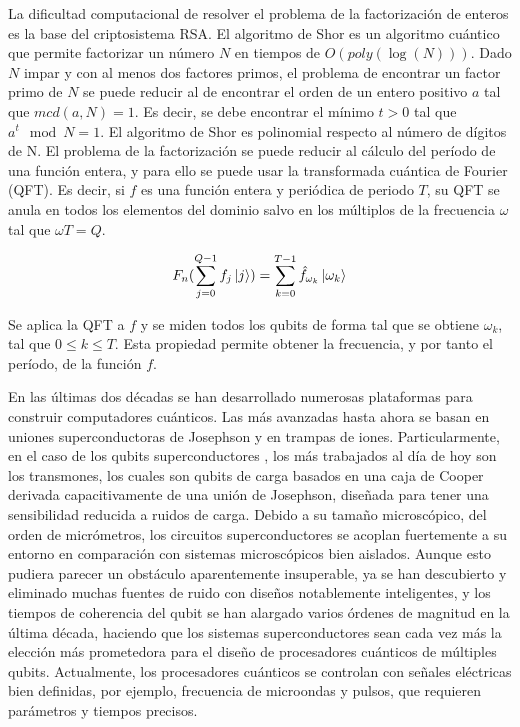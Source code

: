 La dificultad computacional de resolver el problema de la factorización de enteros es la base del criptosistema RSA. El algoritmo de Shor es un algoritmo cuántico que permite factorizar un número $N$ en tiempos de $O(poly(\log (N)))$. Dado $N$ impar y con al menos dos factores primos, el problema de encontrar un factor primo de $N$ se puede reducir al de encontrar el orden de un entero positivo $a$ tal que $mcd(a, N) = 1$. Es decir, se debe encontrar el mínimo $t > 0$ tal que $a^t \mod N = 1$. El algoritmo de Shor es polinomial respecto al número de dígitos de N. El problema de la factorización se puede reducir al cálculo del período de una función entera, y para ello se puede usar la transformada cuántica de Fourier (QFT). Es decir, si $f$ es una función entera y periódica de periodo $T$, su QFT se anula en todos los elementos del dominio salvo en los múltiplos de la frecuencia $\omega$ tal que $\omega T = Q$.

\begin{equation}
    F_n (\sum_{j=0}^{Q-1} f_j \ket{j}) = \sum_{k=0}^{T-1} \hat{f}_{\omega_k} \ket{\omega_k}
\end{equation}

Se aplica la QFT a $f$ y se miden todos los qubits de forma tal que se obtiene $\omega_k$, tal que $0 \leq k \leq T$. Esta propiedad permite obtener la frecuencia, y por tanto el período, de la función $f$.

En las últimas dos décadas se han desarrollado numerosas plataformas para construir computadores cuánticos. Las más avanzadas hasta ahora se basan en uniones superconductoras de Josephson y en trampas de iones. Particularmente, en el caso de los qubits superconductores \cite{Wendin_2017, Devoret_2013, Hu_2017}, los más trabajados al día de hoy son los transmones, los cuales son qubits de carga basados en una caja de Cooper derivada capacitivamente de una unión de Josephson, diseñada para tener una sensibilidad reducida a ruidos de carga. Debido a su tamaño microscópico, del orden de micrómetros, los circuitos superconductores se acoplan fuertemente a su entorno en comparación con sistemas microscópicos bien aislados. Aunque esto pudiera parecer un obstáculo aparentemente insuperable, ya se han descubierto y eliminado muchas fuentes de ruido con diseños notablemente inteligentes, y los tiempos de coherencia del qubit se han alargado varios órdenes de magnitud \cite{Devoret_2013} en la última década, haciendo que los sistemas superconductores sean cada vez más la elección más prometedora para el diseño de procesadores cuánticos de múltiples qubits. Actualmente, los procesadores cuánticos se controlan con señales eléctricas bien definidas, por ejemplo, frecuencia de microondas y pulsos, que requieren parámetros y tiempos precisos.

